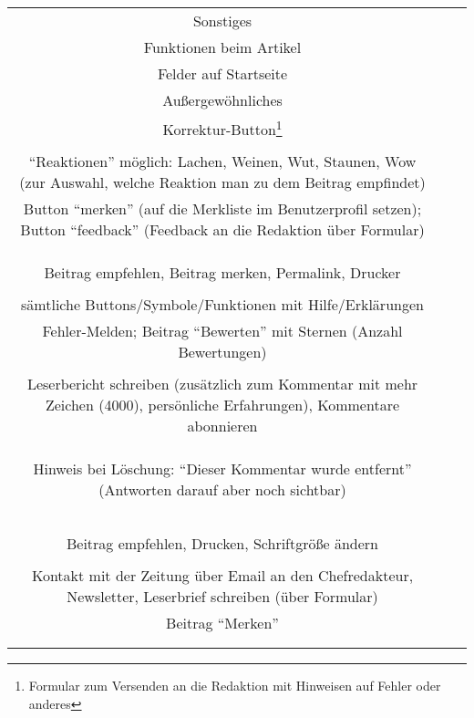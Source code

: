\begin{landscape}
\begin{tabular}{ccc}
{{		\\ \hline

		
Sonstiges\\ 
Funktionen beim Artikel\\
Felder auf Startseite\\
Außergewöhnliches
&		%
		\\
		Korrektur-Button\footnote{Formular zum Versenden an die Redaktion mit Hinweisen auf Fehler oder anderes}\\
		\\
		``Reaktionen'' möglich: Lachen, Weinen, Wut, Staunen, Wow (zur Auswahl, welche Reaktion man zu dem Beitrag empfindet)
		&
		\\
		Button ``merken'' (auf die Merkliste im Benutzerprofil setzen); Button ``feedback'' (Feedback an die Redaktion über Formular) \\
		\\
		\\
		&
		\\
		Beitrag empfehlen, Beitrag merken, Permalink, Drucker\\
		\\
		sämtliche Buttons/Symbole/Funktionen mit Hilfe/Erklärungen
		&
		\\
		Fehler-Melden; Beitrag ``Bewerten'' mit Sternen (Anzahl Bewertungen)\\
		\\
		Leserbericht schreiben (zusätzlich zum Kommentar mit mehr Zeichen (4000), persönliche Erfahrungen), Kommentare abonnieren\\
		&
		\\
		\\
		\\
		Hinweis bei Löschung: ``Dieser Kommentar wurde entfernt'' (Antworten darauf aber noch sichtbar)\\
		&
		\\
		\\
		\\
		\\
		&
		\\
		Beitrag empfehlen, Drucken, Schriftgröße ändern\\
		\\
		Kontakt mit der Zeitung über Email an den Chefredakteur, Newsletter, Leserbrief schreiben (über Formular)
		&
		\\
		Beitrag ``Merken''\\
		\\
}}
\end{tabular}
\end{landscape}
